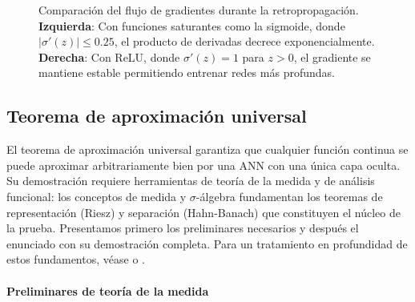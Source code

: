 \begin{figure}[htbp]
\caption[Problema del desvanecimiento del gradiente]{Comparación del flujo de gradientes durante la retropropagación. \textbf{Izquierda}: Con funciones saturantes como la sigmoide, donde $|\sigma'(z)| \leq 0.25$, el producto de derivadas decrece exponencialmente. \textbf{Derecha}: Con ReLU, donde $\sigma'(z) = 1$ para $z > 0$, el gradiente se mantiene estable permitiendo entrenar redes más profundas.}
\label{fig:vanishing_gradient}
\end{figure}

\subsection{Teorema de aproximación universal}\label{sec:aproximacion_universal}

El teorema de aproximación universal garantiza que cualquier función continua se puede aproximar arbitrariamente bien por una \gls{ANN} con una única capa oculta. Su demostración requiere herramientas de teoría de la medida y de análisis funcional: los conceptos de medida y $\sigma$-álgebra fundamentan los teoremas de representación (Riesz) y separación (Hahn-Banach) que constituyen el núcleo de la prueba. Presentamos primero los preliminares necesarios y después el enunciado con su demostración completa. Para un tratamiento en profundidad de estos fundamentos, véase \citet{Folland1999} o \citet{Rudin1976}.

\paragraph{Preliminares de teoría de la medida}

